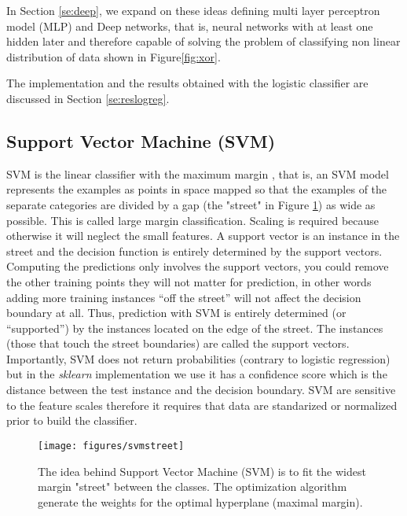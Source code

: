 \documentclass[11pt]{article}
\theoremstyle{definition}
\theoremstyle{remark}
\begin{document}
In Section \ref{se:deep}, we expand on these ideas defining multi layer perceptron model (MLP) and Deep networks, that is, neural networks with at least one hidden later and therefore capable of solving the problem of classifying non linear distribution of data shown in Figure\ref{fig:xor}.

The implementation and the results obtained with the logistic classifier are discussed in Section \ref{se:reslogreg}. 

\subsection{Support Vector Machine (SVM)}
\label{sse:svm}
SVM is the linear classifier with the maximum margin \cite{vapnik2013nature}, that is, an SVM model represents the examples as points in space mapped so that the examples of the separate categories are divided by a gap (the "street" in Figure \ref{fig:svmstreet}) as wide as possible. This is called large margin classification. Scaling is required because otherwise it will neglect the small features.
A support vector is an instance in the street and the decision function is entirely determined by the support vectors. Computing the predictions only involves the support vectors, you could remove the other training points they will not matter for prediction, in other words adding more training instances “off the street” will not affect the decision boundary at all. Thus, prediction with SVM is entirely determined (or “supported”) by the instances located on the edge of the street. The instances (those that touch the street boundaries) are called the support vectors. Importantly, SVM does not return probabilities (contrary to logistic regression) but in the \emph{sklearn} implementation we use it has a confidence score which is the distance between the test instance and the decision boundary. SVM are sensitive to the feature scales therefore it requires that data are standarized or normalized prior to build the classifier. 

\begin{figure}[H]
        \centering
        \texttt{[image: figures/svmstreet]}
        \caption{The idea behind Support Vector Machine (SVM) is to fit the widest margin "street" between the classes. The optimization algorithm generate the weights for the optimal hyperplane (maximal margin).} \label{fig:svmstreet} %
        
\end{figure}
\end{document}
